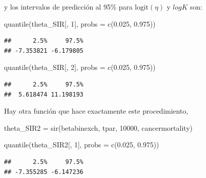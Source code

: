 \documentclass[
  12pt,
]{book}
\newenvironment{Shaded}{\begin{snugshade}}{\end{snugshade}}
\newcommand{\AttributeTok}[1]{\textcolor[rgb]{0.77,0.63,0.00}{#1}}
\newcommand{\DecValTok}[1]{\textcolor[rgb]{0.00,0.00,0.81}{#1}}
\newcommand{\FloatTok}[1]{\textcolor[rgb]{0.00,0.00,0.81}{#1}}
\newcommand{\FunctionTok}[1]{\textcolor[rgb]{0.00,0.00,0.00}{#1}}
\newcommand{\NormalTok}[1]{#1}
\newcommand{\OtherTok}[1]{\textcolor[rgb]{0.56,0.35,0.01}{#1}}
\theoremstyle{definition}
\theoremstyle{definition}
\theoremstyle{definition}
\theoremstyle{definition}
\theoremstyle{remark}
\begin{document}
y los intervalos de predicción al 95\% para \(\text{logit}(\eta)\) y \(log K\) son:

\begin{Shaded}
\begin{Highlighting}[]
\FunctionTok{quantile}\NormalTok{(theta\_SIR[, }\DecValTok{1}\NormalTok{], }\AttributeTok{probs =} \FunctionTok{c}\NormalTok{(}\FloatTok{0.025}\NormalTok{, }\FloatTok{0.975}\NormalTok{))}
\end{Highlighting}
\end{Shaded}

\begin{verbatim}
##      2.5%     97.5% 
## -7.353821 -6.179805
\end{verbatim}

\begin{Shaded}
\begin{Highlighting}[]
\FunctionTok{quantile}\NormalTok{(theta\_SIR[, }\DecValTok{2}\NormalTok{], }\AttributeTok{probs =} \FunctionTok{c}\NormalTok{(}\FloatTok{0.025}\NormalTok{, }\FloatTok{0.975}\NormalTok{))}
\end{Highlighting}
\end{Shaded}

\begin{verbatim}
##      2.5%     97.5% 
##  5.618474 11.198193
\end{verbatim}

Hay otra función que hace exactamente este procedimiento,

\begin{Shaded}
\begin{Highlighting}[]
\NormalTok{theta\_SIR2 }\OtherTok{=} \FunctionTok{sir}\NormalTok{(betabinexch, tpar, }\DecValTok{10000}\NormalTok{, cancermortality)}
\end{Highlighting}
\end{Shaded}

\begin{Shaded}
\begin{Highlighting}[]
\FunctionTok{quantile}\NormalTok{(theta\_SIR2[, }\DecValTok{1}\NormalTok{], }\AttributeTok{probs =} \FunctionTok{c}\NormalTok{(}\FloatTok{0.025}\NormalTok{, }\FloatTok{0.975}\NormalTok{))}
\end{Highlighting}
\end{Shaded}

\begin{verbatim}
##      2.5%     97.5% 
## -7.355285 -6.147236
\end{verbatim}
\end{document}
